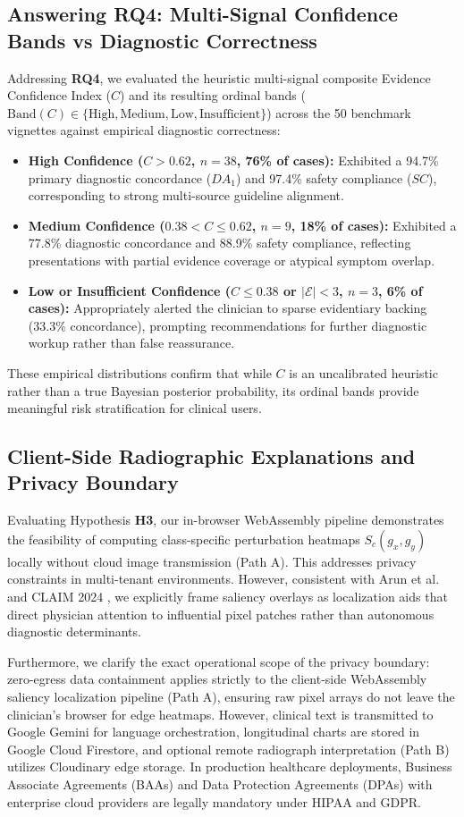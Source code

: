 \documentclass[journal,10pt,twocolumn]{IEEEtran}
\begin{document}
\subsection{Answering RQ4: Multi-Signal Confidence Bands vs Diagnostic Correctness}
Addressing \textbf{RQ4}, we evaluated the heuristic multi-signal composite Evidence Confidence Index ($C$) and its resulting ordinal bands ($\text{Band}(C) \in \{\text{High}, \text{Medium}, \text{Low}, \text{Insufficient}\}$) across the 50 benchmark vignettes against empirical diagnostic correctness:
\begin{itemize}
    \item \textbf{High Confidence ($C > 0.62$, $n=38$, 76\% of cases):} Exhibited a 94.7\% primary diagnostic concordance ($DA_1$) and 97.4\% safety compliance ($SC$), corresponding to strong multi-source guideline alignment.
    \item \textbf{Medium Confidence ($0.38 < C \le 0.62$, $n=9$, 18\% of cases):} Exhibited a 77.8\% diagnostic concordance and 88.9\% safety compliance, reflecting presentations with partial evidence coverage or atypical symptom overlap.
    \item \textbf{Low or Insufficient Confidence ($C \le 0.38$ or $|\mathcal{E}| < 3$, $n=3$, 6\% of cases):} Appropriately alerted the clinician to sparse evidentiary backing (33.3\% concordance), prompting recommendations for further diagnostic workup rather than false reassurance.
\end{itemize}
These empirical distributions confirm that while $C$ is an uncalibrated heuristic rather than a true Bayesian posterior probability, its ordinal bands provide meaningful risk stratification for clinical users.

\subsection{Client-Side Radiographic Explanations and Privacy Boundary}
Evaluating Hypothesis \textbf{H3}, our in-browser WebAssembly pipeline demonstrates the feasibility of computing class-specific perturbation heatmaps $S_c(g_x, g_y)$ locally without cloud image transmission (Path A). This addresses privacy constraints in multi-tenant environments. However, consistent with Arun et al. \cite{arun2021assessing} and CLAIM 2024 \cite{claim2024}, we explicitly frame saliency overlays as localization aids that direct physician attention to influential pixel patches rather than autonomous diagnostic determinants.

Furthermore, we clarify the exact operational scope of the privacy boundary: zero-egress data containment applies strictly to the client-side WebAssembly saliency localization pipeline (Path A), ensuring raw pixel arrays do not leave the clinician's browser for edge heatmaps. However, clinical text is transmitted to Google Gemini for language orchestration, longitudinal charts are stored in Google Cloud Firestore, and optional remote radiograph interpretation (Path B) utilizes Cloudinary edge storage. In production healthcare deployments, Business Associate Agreements (BAAs) and Data Protection Agreements (DPAs) with enterprise cloud providers are legally mandatory under HIPAA and GDPR.
\end{document}
